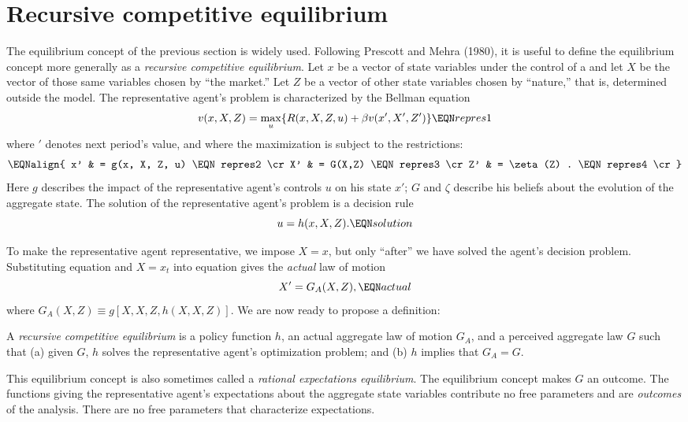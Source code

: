 \section{Recursive competitive equilibrium}\label{sec:rce22}%
The equilibrium concept of the previous section
is widely used.  Following Prescott and Mehra (1980),
it is useful to define the  equilibrium concept more  generally
as a {\it recursive competitive equilibrium}.
  Let $x$ be a vector of state variables under the control
of a  and let $X$ be the vector of those
same variables chosen by ``the market.''  Let $Z$ be a vector
of other state variables chosen by ``nature,'' that is, determined
outside the model.
The representative agent's problem is
 characterized by the Bellman equation
$$ v(x, X, Z) = \max_u \{ R(x, X, Z, u) + \beta v(x', X', Z') \} \EQN repres1$$
where $'$ denotes next period's value, and where the
maximization is subject to the restrictions:
$$ \EQNalign{ x' & = g(x, X, Z, u) \EQN repres2 \cr
              X' & = G(X,Z)   \EQN repres3 \cr
              Z' & = \zeta(Z) . \EQN repres4 \cr}$$
Here $g$ describes the impact of the representative   agent's
controls $u$ on his state $x'$; $G$ and $\zeta$ describe his beliefs about
the evolution of the aggregate state.  The solution of the
representative agent's    problem is a decision rule
$$ u = h(x, X, Z).  \EQN solution $$

 To make the representative agent representative, we impose
$X = x$, but only ``after'' we have solved the agent's decision
problem.   Substituting equation  and $X = x_t$ into equation
 gives the {\it actual} law of motion
$$ X' = G_A (X, Z), \EQN actual $$
where $G_A(X, Z) \equiv g[X, X, Z, h(X, X, Z)]$.
We are now ready to propose a definition:

\medskip

  A {\it recursive competitive equilibrium}
is a policy function $h$, an actual aggregate law of motion
$G_A$, and a perceived aggregate
law $G$ such that  (a)  given $G$, $h$ solves   the representative
agent's optimization problem; and (b)  $h$ implies
that $G_A = G$.


\medskip
This equilibrium concept is also sometimes called a {\it rational expectations
equilibrium}.  The equilibrium concept
makes $G$ an outcome.  The functions
giving the  representative
agent's expectations about the aggregate state variables
 contribute no free parameters
and are {\it outcomes} of the analysis.  There are no free parameters that characterize
expectations.


